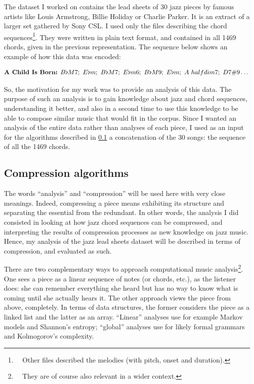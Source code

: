 \documentclass[a4paper,10pt]{article}
\newcommand{\guill}[1]{“#1”}
\begin{document}
The dataset I worked on contains the lead sheets of 30 jazz pieces by famous artists like Louis Armstrong, Billie Holiday or Charlie Parker. It is an extract of a larger set gathered by Sony CSL. I used only the files describing the chord sequences\footnote{~~Other files described the melodies (with pitch, onset and duration).}. They were written in plain text format, and contained in all 1469 chords, given in the previous representation. The sequence below shows an example of how this data was encoded:

\begin{equation*}
\text{\textbf{A Child Is Born:} } B\flat M7;~E\flat m;~B\flat M7;~E\flat m6;~B\flat M9;~E\flat m;~A~halfdim7;~D 7\#9\dots
\end{equation*}

So, the motivation for my work was to provide an analysis of this data. The purpose of such an analysis is to gain knowledge about jazz and chord sequences, understanding it better, and also in a second time to use this knowledge to be able to compose similar music that would fit in the corpus. Since I wanted an analysis of the entire data rather than analyses of each piece, I used as an input for the algorithms described in \ref{algos} a concatenation of the 30 songs: the sequence of all the 1469 chords.



\subsection{Compression algorithms}
\label{algos}

The words \guill{analysis} and \guill{compression} will be used here with very close meanings. Indeed, compressing a piece means exhibiting its structure and separating the essential from the redundant. In other words, the analysis I did consisted in looking at how jazz chord sequences can be compressed, and interpreting the results of compression processes as new knowledge on jazz music. Hence, my analysis of the jazz lead sheets dataset will be described in terms of compression, and evaluated as such.

There are two complementary ways to approach computational music analysis\footnote{~~They are of course also relevant in a wider context.}. 
One sees a piece as a linear sequence of notes (or chords, etc.), as the listener does: she can remember everything she heard but has no way to know what is coming until she actually hears it. The other approach views the piece from above, completely. In terms of data structures, the former considers the piece as a linked list and the latter as an array. \guill{Linear} analyses use for example Markov models and Shannon's entropy; \guill{global} analyses use for likely formal grammars and Kolmogorov's complexity.
\end{document}
